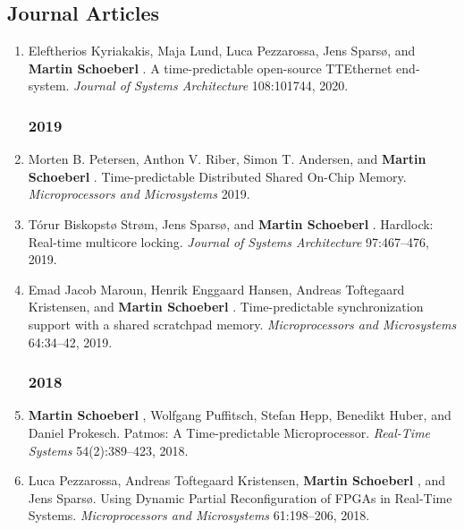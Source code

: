 \subsection*{Journal Articles}

\begin{enumerate}

\subsubsection*{2020}

\item Eleftherios Kyriakakis, Maja Lund, Luca Pezzarossa, Jens Spars{\o}, and {\bf Martin Schoeberl }.
 A time-predictable open-source TTEthernet end-system.
 \emph{Journal of Systems Architecture} 108:101744, 2020.


\subsubsection*{2019}

\item Morten B. Petersen, Anthon V. Riber, Simon T. Andersen, and {\bf Martin Schoeberl }.
 Time-predictable Distributed Shared On-Chip Memory.
 \emph{Microprocessors and Microsystems} 2019.

\item T{\'o}rur Biskopst{\o} Str{\o}m, Jens Spars{\o}, and {\bf Martin Schoeberl }.
 Hardlock: Real-time multicore locking.
 \emph{Journal of Systems Architecture} 97:467--476, 2019.

\item Emad Jacob Maroun, Henrik Enggaard Hansen, Andreas Toftegaard Kristensen, and {\bf Martin Schoeberl }.
 Time-predictable synchronization support with a shared scratchpad memory.
 \emph{Microprocessors and Microsystems} 64:34--42, 2019.


\subsubsection*{2018}

\item {\bf Martin Schoeberl }, Wolfgang Puffitsch, Stefan Hepp, Benedikt Huber, and Daniel Prokesch.
 Patmos: A Time-predictable Microprocessor.
 \emph{Real-Time Systems} 54(2):389--423, 2018.

\item Luca Pezzarossa, Andreas Toftegaard Kristensen, {\bf Martin Schoeberl }, and Jens Spars{\o}.
 Using Dynamic Partial Reconfiguration of FPGAs in Real-Time Systems.
 \emph{Microprocessors and Microsystems} 61:198--206, 2018.


\end{enumerate}
